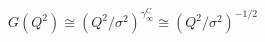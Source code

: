 \begin{equation}
  G(Q^2)  \cong \left( Q^2/\sigma^2 \right)^{\gamma^{C}_{\infty}} 
\cong \left( Q^2/\sigma^2 \right)^{-1/2} 
\end{equation}

